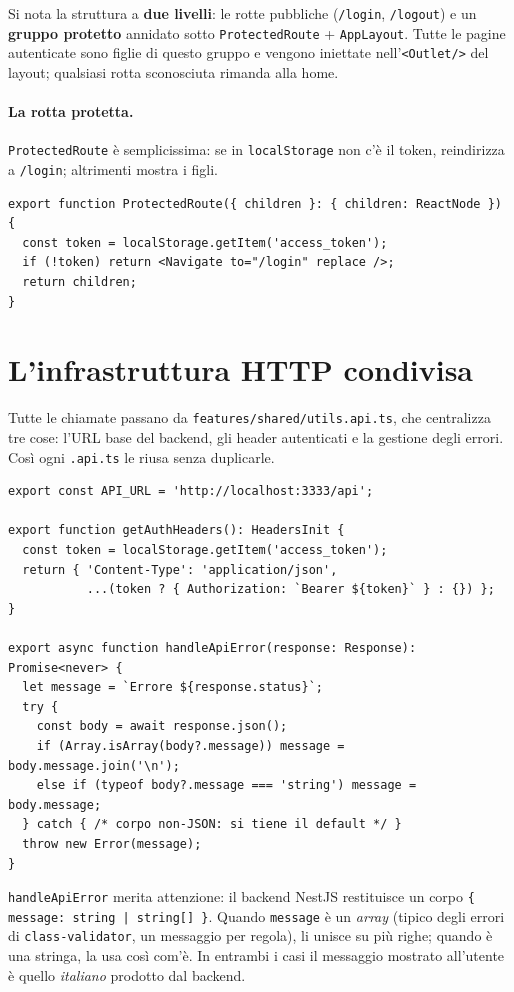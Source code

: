 \documentclass[11pt,a4paper,oneside]{report}
\newcommand{\code}[1]{\texttt{\small #1}}
\newcommand{\file}[1]{\texttt{\small #1}}
\begin{document}
Si nota la struttura a \textbf{due livelli}: le rotte pubbliche
(\code{/login}, \code{/logout}) e un \textbf{gruppo protetto} annidato sotto
\code{ProtectedRoute} + \code{AppLayout}. Tutte le pagine autenticate sono figlie
di questo gruppo e vengono iniettate nell'\code{<Outlet/>} del layout; qualsiasi
rotta sconosciuta rimanda alla home.

\paragraph{La rotta protetta.} \code{ProtectedRoute} è semplicissima: se in
\code{localStorage} non c'è il token, reindirizza a \code{/login}; altrimenti
mostra i figli.

\begin{lstlisting}[caption={\file{protected-route.tsx}.}]
export function ProtectedRoute({ children }: { children: ReactNode }) {
  const token = localStorage.getItem('access_token');
  if (!token) return <Navigate to="/login" replace />;
  return children;
}
\end{lstlisting}

\section{L'infrastruttura HTTP condivisa}
Tutte le chiamate passano da \file{features/shared/utils.api.ts}, che centralizza
tre cose: l'URL base del backend, gli header autenticati e la gestione degli
errori. Così ogni \file{*.api.ts} le riusa senza duplicarle.

\begin{lstlisting}[caption={\file{shared/utils.api.ts} (estratto).}]
export const API_URL = 'http://localhost:3333/api';

export function getAuthHeaders(): HeadersInit {
  const token = localStorage.getItem('access_token');
  return { 'Content-Type': 'application/json',
           ...(token ? { Authorization: `Bearer ${token}` } : {}) };
}

export async function handleApiError(response: Response): Promise<never> {
  let message = `Errore ${response.status}`;
  try {
    const body = await response.json();
    if (Array.isArray(body?.message)) message = body.message.join('\n');
    else if (typeof body?.message === 'string') message = body.message;
  } catch { /* corpo non-JSON: si tiene il default */ }
  throw new Error(message);
}
\end{lstlisting}

\code{handleApiError} merita attenzione: il backend NestJS restituisce un corpo
\code{\{ message: string | string[] \}}. Quando \code{message} è un \emph{array}
(tipico degli errori di \code{class-validator}, un messaggio per regola), li
unisce su più righe; quando è una stringa, la usa così com'è. In entrambi i casi
il messaggio mostrato all'utente è quello \emph{italiano} prodotto dal backend.
\end{document}
